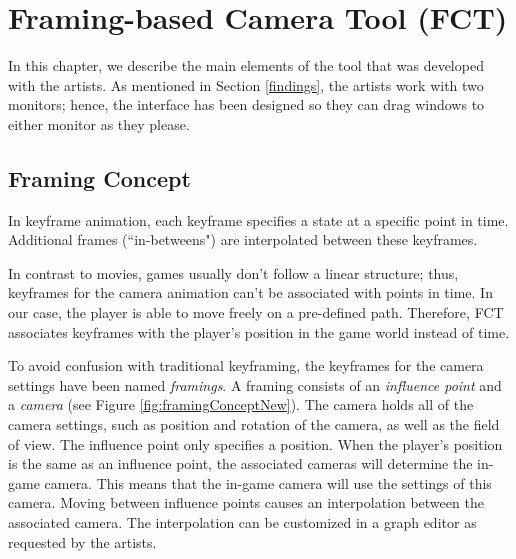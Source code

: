 \section{Framing-based Camera Tool (FCT)}
In this chapter, we describe the main elements of the tool that was developed with the artists. As mentioned in Section \ref{findings}, the artists work with two monitors; hence, the interface has been designed so they can drag windows to either monitor as they please.

\subsection{Framing Concept}
In keyframe animation, each keyframe specifies a state at a specific point in time. Additional frames (``in-betweens") are interpolated between these keyframes.



In contrast to movies, games usually don't follow a linear structure; thus, keyframes for the camera animation can't be associated with points in time. In our case, the player is able to move freely on a pre-defined path. Therefore, FCT associates keyframes with the player's position in the game world instead of time.

To avoid confusion with traditional keyframing, the keyframes for the camera settings have been named \textit{framings}. A framing consists of an \textit{influence point} and a \textit{camera} (see Figure \ref{fig:framingConceptNew}). The camera holds all of the camera settings, such as position and rotation of the camera, as well as the field of view. The influence point only specifies a position. When the player's position is the same as an influence point, the associated cameras will determine the in-game camera. This means that the in-game camera will use the settings of this camera. Moving between influence points causes an interpolation between the associated camera. The interpolation can be customized in a graph editor as requested by the artists.

